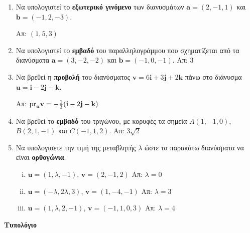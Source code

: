\documentclass[a4paper,table]{report}
\renewcommand{\vec}{\mathbf}
\begin{document}
\begin{enumerate}
  \item Να υπολογιστεί το \textbf{εξωτερικό γινόμενο} των διανυσμάτων 
    $ \vec{a} = (2,-1,1) $ και $ \vec{b} = (-1,2,-3) $.

    \hfill Απ: $ (1,5,3) $

  \item Να υπολογιστεί το \textbf{εμβαδό} του παραλληλογράμμου που σχηματίζεται από τα 
    διανύσματα $ \vec{a} = (3,-2,-2) $ και $ \vec{b} = (-1,0,-1) $.
    \hfill Απ: $3 $ 

  \item Να βρεθεί η \textbf{προβολή} του διανύσματος 
    $ \mathbf{v} = 6 \mathbf{i}+3 \mathbf{j} + 2 \mathbf{k} $ πάνω στο διάνυσμα 
    $ \mathbf{u} = \mathbf{i}-2 \mathbf{j} - \mathbf{k} $.

    \hfill Απ: $ \rm{pr}_{\mathbf{u}}{\mathbf{v}} = -\frac{1}{3} (\mathbf{i}-2
    \mathbf{j}- \mathbf{k}) $ 

  \item Να βρεθεί το \textbf{εμβαδό} του τριγώνου, με κορυφές τα σημεία $ A(1,-1,0) $, 
    $ B(2,1,-1) $ και $ C(-1,1,2) $. 
    \hfill Απ: $ 3 \sqrt{2} $ 

  \item Να υπολογισετε την τιμή της μεταβλητής $ \lambda $ ώστε τα παρακάτω διανύσματα 
    να είναι \textbf{ορθογώνια}.
    \begin{enumerate}[i)]
      \item $ \mathbf{u} = (1, \lambda, -1) $, $ \mathbf{v} = (2,-1,2) $ \hfill 
        Απ: $ \lambda = 0 $
      \item $ \mathbf{u} = (- \lambda, 2 \lambda, 3) $, $ \mathbf{v} = (1,-4,-1) $ 
        \hfill Απ: $ \lambda = 3 $ 
      \item $ \mathbf{u} = (1, \lambda, 2,-1) $, $ \mathbf{v} = (-1,1,0,3) $ \hfill Απ: $
        \lambda = 4 $ 
    \end{enumerate}
\end{enumerate}

\vspace{\baselineskip}

\begin{center}
  \textcolor{Col1}{\large\textbf{Τυπολόγιο}}
\end{center}
\end{document}
